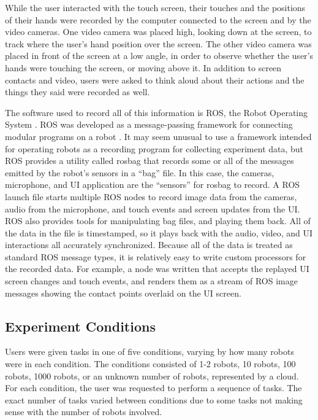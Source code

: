 \documentclass[]{article}
\begin{document}
While the user interacted with the touch screen, their touches and the positions of their hands were recorded by the computer connected to the screen and by the video cameras. 
One video camera was placed high, looking down at the screen, to track where the user's hand position over the screen. 
The other video camera was placed in front of the screen at a low angle, in order to observe whether the user's hands were touching the screen, or moving above it. 
In addition to screen contacts and video, users were asked to think aloud about their actions and the things they said were recorded as well. 

The software used to record all of this information is ROS, the Robot Operating System . 
ROS was developed as a message-passing framework for connecting modular programs on a robot . 
It may seem unusual to use a framework intended for operating robots as a recording program for collecting experiment data, but ROS provides a utility called rosbag that records some or all of the messages emitted by the robot's sensors in a ``bag'' file. 
In this case, the cameras, microphone, and UI application are the ``sensors'' for rosbag to record.
A ROS launch file starts multiple ROS nodes to record image data from the cameras, audio from the microphone, and touch events and screen updates from the UI.
ROS also provides tools for manipulating bag files, and playing them back. 
All of the data in the file is timestamped, so it plays back with the audio, video, and UI interactions all accurately synchronized. 
Because all of the data is treated as standard ROS message types, it is relatively easy to write custom processors for the recorded data.
For example, a node was written that accepts the replayed UI screen changes and touch events, and renders them as a stream of ROS image messages showing the contact points overlaid on the UI screen. 

\subsection{Experiment Conditions}

Users were given tasks in one of five conditions, varying by how many robots were in each condition. 
The conditions consisted of 1-2 robots, 10 robots, 100 robots, 1000 robots, or an unknown number of robots, represented by a cloud. 
For each condition, the user was requested to perform a sequence of tasks. 
The exact number of tasks varied between conditions due to some tasks not making sense with the number of robots involved. 
\end{document}
